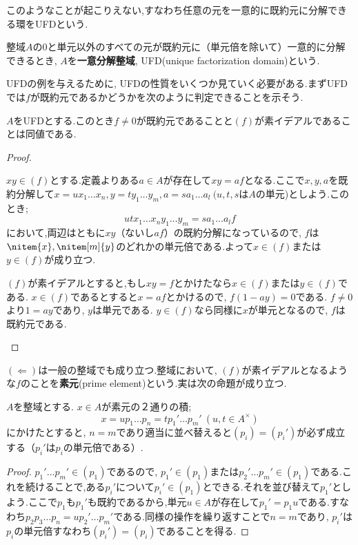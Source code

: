 このようなことが起こりえない,すなわち任意の元を一意的に既約元に分解できる環をUFDという.

\begin{defi}[UFD]
	整域$A$の$0$と単元以外のすべての元が既約元に（単元倍を除いて）一意的に分解できるとき, $A$を\textbf{一意分解整域}, UFD(unique factorization domain)という.
\end{defi}

UFDの例を与えるために, UFDの性質をいくつか見ていく必要がある.まずUFDでは$f$が既約元であるかどうかを次のように判定できることを示そう.
\begin{prop}
	$A$をUFDとする.このとき$f\neq0$が既約元であることと$(f)$が素イデアルであることは同値である.
\end{prop}
\begin{proof}
	\begin{eqv}
		\item $xy\in(f)$とする.定義よりある$a\in A$が存在して$xy=af$となる.ここで$x,y,a$を既約分解して$x=ux_1\dots x_n,y=ty_1\dots y_m,a=sa_1\dots a_l~(u,t,s$は$A$の単元)としよう.このとき;
		\[utx_1\dots x_ny_1\dots y_m=sa_1\dots a_lf\]
		において,両辺はともに$xy$（ないし$af$）の既約分解になっているので, $f$は$\nitem{x},\nitem[m]{y}$のどれかの単元倍である.よって$x\in(f)$または$y\in(f)$が成り立つ.
		
		\item $(f)$が素イデアルとすると,もし$xy=f$とかけたなら$x\in (f)$または$y\in(f)$である. $x\in (f)$であるとすると$x=af$とかけるので, $f(1-ay)=0$である. $f\neq0$より$1=ay$であり, $y$は単元である. $y\in (f)$なら同様に$x$が単元となるので, $f$は既約元である.
	\end{eqv}
\end{proof}

$(\Longleftarrow)$は一般の整域でも成り立つ.整域において, $(f)$が素イデアルとなるような$f$のことを\textbf{素元}(prime element)という.実は次の命題が成り立つ.

\begin{prop}
	$A$を整域とする. $x\in A$が素元の２通りの積;
	\[x=up_1\dots p_n=tp_1'\dots p_m'~(u,t\in A^\times)\]
	にかけたとすると, $n=m$であり適当に並べ替えると$(p_i)=(p_i')$が必ず成立する（$p_i'$は$p_i$の単元倍である）.
\end{prop}

\begin{proof}
	$p_1'\dots p_m'\in (p_1)$であるので, $p_1'\in (p_1)$または$p_2'\dots p_m'\in (p_1)$である.これを続けることで,ある$p_i'$について$p_i'\in (p_1)$とできる.それを並び替えて$p_1'$としよう.ここで$p_1$も$p_1'$も既約であるから,単元$u\in A$が存在して$p_1'=p_1u$である.すなわち$p_2p_3\dots p_n=up_2'\dots p_m'$である.同様の操作を繰り返すことで$n=m$であり, $p_i'$は$p_i$の単元倍すなわち$(p_i')=(p_i)$であることを得る.
\end{proof}

